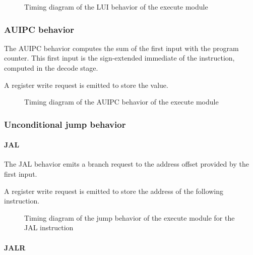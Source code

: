 \begin{figure}[H]
    \centering
    
    \caption{Timing diagram of the LUI behavior of the execute module}
    \label{fig:exm-behavior-lui}
\end{figure}

\subsubsection{AUIPC behavior}

\begin{content}
    The AUIPC behavior computes the sum of the first input with the program counter. This first input is the sign-extended immediate of the instruction, computed in the decode stage.
    
    A register write request is emitted to store the value.
\end{content}

\begin{figure}[H]
    \centering
    
    \caption{Timing diagram of the AUIPC behavior of the execute module}
    \label{fig:exm-behavior-auipc}
\end{figure}

\subsubsection{Unconditional jump behavior}

\paragraph{JAL}

\begin{content}
    The JAL behavior emits a branch request to the address offset provided by the first input.
    
    A register write request is emitted to store the address of the following instruction.
\end{content}

\begin{figure}[H]
    \centering
    
    \caption{Timing diagram of the jump behavior of the execute module for the JAL instruction}
    \label{fig:exm-behavior-jump-jal}
\end{figure}

\paragraph{JALR}

